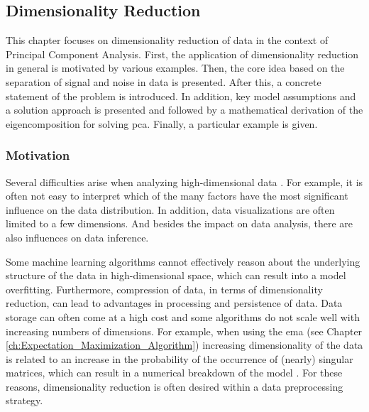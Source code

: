 \documentclass[../../../main.tex]{subfiles}
\begin{document}
\subsection{Dimensionality Reduction}\label{ch:dimensionality_reduction}

This chapter focuses on dimensionality reduction of data in the context of Principal Component Analysis. First, the application of dimensionality reduction in general is motivated by various examples. Then, the core idea based on the separation of signal and noise in data is presented. After this, a concrete statement of the problem is introduced. In addition, key model assumptions and a solution approach is presented and followed by a mathematical derivation of the eigencomposition for solving \gls{pca}. Finally, a particular example is given.

\subsubsection{Motivation}

Several difficulties arise when analyzing high-dimensional data \cite[p.286]{dei_2020}. For example, it is often not easy to interpret which of the many factors have the most significant influence on the data distribution. In addition, data visualizations are often limited to a few dimensions. And besides the impact on data analysis, there are also influences on data inference. 

Some machine learning algorithms cannot effectively reason about the underlying structure of the data in high-dimensional space, which can result into a model overfitting. Furthermore, compression of data, in terms of dimensionality reduction, can lead to advantages in processing and persistence of data. Data storage can often come at a high cost and some algorithms do not scale well with increasing numbers of dimensions. For example, when using the \gls{ema} (see Chapter \ref{ch:Expectation_Maximization_Algorithm}) increasing dimensionality of the data is related to an increase in the probability of the occurrence of (nearly) singular matrices, which can result in a numerical breakdown of the model \cite[p.434]{bis_2006}. For these reasons, dimensionality reduction is often desired within a data preprocessing strategy.
\end{document}
